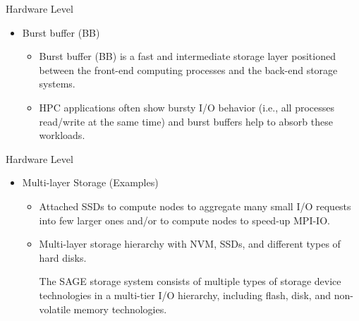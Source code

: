 \documentclass[compress,11pt,xcolor=svgnames,aspectratio=169]{beamer}
\begin{document}
\begin{frame}[t]{Hardware Level}

\begin{itemize}

    \item Burst buffer (BB)\\[0.4cm]

      \begin{itemize}
      \setlength\itemsep{0.6cm}

      \item Burst buffer (BB) is a fast and intermediate storage layer positioned between the front-end computing processes and the back-end storage systems.

      \item HPC applications often show bursty I/O behavior (i.e., all processes read/write at the same time) and burst buffers help to absorb these workloads.

      \end{itemize}

\end{itemize}

\end{frame}

\begin{frame}[t]{Hardware Level}

\begin{itemize}

      \item Multi-layer Storage (Examples)\\[0.4cm]

        \begin{itemize}
        \setlength\itemsep{0.6cm}

        \item Attached SSDs to compute nodes to aggregate many small I/O requests into few larger ones and/or to compute nodes to speed-up MPI-IO.

        \item Multi-layer storage hierarchy with NVM, SSDs, and different types of hard disks. %

The SAGE storage system consists of multiple types of storage device technologies in a multi-tier I/O hierarchy, including flash, disk, and non-volatile memory technologies.

        \end{itemize}

\end{itemize}

\end{frame}
\end{document}
